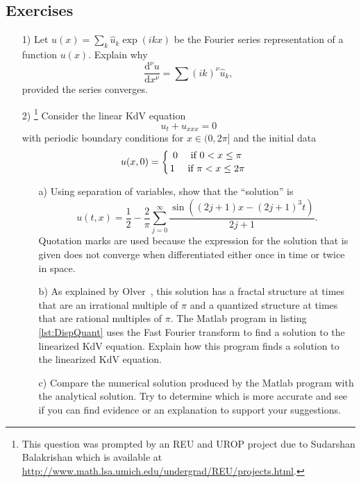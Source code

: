 \subsection{Exercises}
\begin{enumerate}
\item[1)] Let $u(x)=\sum_k \hat{u}_k \exp(ikx)$ be the Fourier series representation of a function $u(x)$. Explain why 
$$\frac{\mathrm{d}^{\nu}u}{\mathrm{d}x^{\nu}}=\sum (ik)^{\nu}\hat{u}_k,$$
provided the series converges.
\item[2)] \footnote{This question was prompted by an REU and UROP project due to Sudarshan Balakrishan which is available at \url{http://www.math.lsa.umich.edu/undergrad/REU/projects.html}.} Consider the linear KdV equation
$$u_t+u_{xxx}=0$$
with periodic boundary conditions for $x\in(0,2\pi]$ and the initial data
\begin{align*}
&{} u(x,0)= \left\{{0\quad\textup{ if } 0< x\leq\pi}\atop{1\quad\textup{ if } \pi<x\leq2\pi }\right.
\end{align*}
\begin{enumerate}
\item[a)] Using separation of variables, show that the ``solution'' is
$$u(t,x)=\frac{1}{2}-\frac{2}{\pi}\sum_{j=0}^{\infty}\frac{\sin((2j+1)x-(2j+1)^3t)}{2j+1}.$$
Quotation marks are used because the expression for the solution that is given does not converge when differentiated either once in time or twice in space.
\item[b)] As explained by Olver~\cite{Olv10}, this solution has a fractal structure at times that are an irrational multiple of $\pi$ and a quantized structure at times that are rational multiples of $\pi$. The Matlab program in listing \ref{lst:DispQuant} uses the Fast Fourier transform to find a solution to the linearized KdV equation.  Explain how this program finds a solution to the linearized KdV equation.
\item[c)] Compare the numerical solution produced by the Matlab program with the analytical solution. Try to determine which is more accurate and see if you can find evidence or an explanation to support your suggestions.
\end{enumerate}


 
\end{enumerate}
